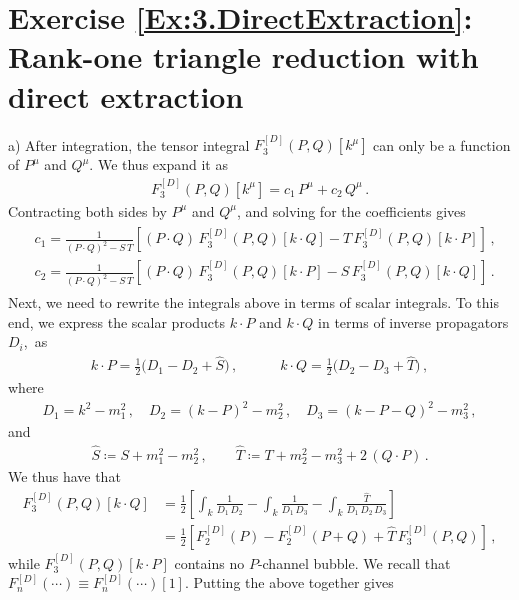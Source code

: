 \section*{Exercise \ref{Ex:3.DirectExtraction}: Rank-one triangle reduction with direct extraction}
\label{Sol:3.DirectExtraction}
%
a) After integration, the tensor integral $F_3^{[D]}(P,Q)[k^{\mu}]$ can only be a function of $P^{\mu}$ and $Q^{\mu}$. We thus expand it as
\begin{align}
F_3^{[D]}(P,Q)[k^{\mu}] = c_1 \, P^{\mu} + c_2 \, Q^{\mu} \,.
\end{align}
Contracting both sides by $P^{\mu}$ and $Q^{\mu}$, and solving for the coefficients gives
\begin{align} \label{eq:triangle_c1c2}
\begin{aligned}
& c_1 =  \frac{1}{(P\cdot Q)^2-S \, T} \left[ (P\cdot Q) \, F_3^{[D]}(P,Q)[k\cdot Q] - T \, F_3^{[D]}(P,Q)[k\cdot P] \right] \,, \\
& c_2 =  \frac{1}{(P\cdot Q)^2-S \, T} \left[ (P\cdot Q) \,  F_3^{[D]}(P,Q)[k\cdot P] - S \, F_3^{[D]}(P,Q)[k\cdot Q]  \right] \,.
\end{aligned}
\end{align}
Next, we need to rewrite the integrals above in terms of scalar integrals. To this end, we express
the scalar products $k \cdot P$ and $k \cdot Q$ in terms of inverse propagators $D_i$,~as
\begin{align}
k \cdot P = \frac{1}{2} \bigl(D_1-D_2 + 
\hat{S} \bigr) \,, \qquad \quad
k \cdot Q = \frac{1}{2} \bigl( D_2 - D_3 + \hat{T} \bigr) \,,
\end{align}
where 
\begin{align}
D_1 = k^2 - m_1^2 \,, \quad D_2 = (k-P)^2 - m_2^2 \,, \quad D_3 = (k-P-Q)^2-m_3^2\,,
\end{align}
and 
\begin{align}
\hat{S} \coloneqq S + m_1^2 - m_2^2 \,, \qquad \hat{T} \coloneqq T + m_2^2 - m_3^2 + 2 \, (Q\cdot P) \,.
\end{align}
We thus have that
\begin{align}
F_3^{[D]} (P,Q)[k \cdot Q] & = \frac{1}{2} \left[ \int_k \frac{1}{D_1 \, D_2} - \int_k \frac{1}{D_1 \, D_3} - \int_k \frac{\hat{T}}{D_1 \, D_2 \, D_3}  \right] \nonumber \\
& = \frac{1}{2} \left[ F_2^{[D]}(P) - F_2^{[D]}(P+Q) + \hat{T}  \, F_3^{[D]}(P,Q) \right] \,,
\end{align}
while $F_3^{[D]} (P,Q)[k \cdot P] $ contains no $P$-channel bubble. We recall that $F_n^{[D]}(\cdots) \equiv F_n^{[D]}(\cdots)[1]$. Putting the above together gives
